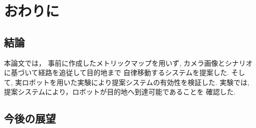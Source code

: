 \chapter{おわりに}
\label{chap:end}
\section{結論}
本論文では，
事前に作成したメトリックマップを用いず, 
カメラ画像とシナリオに基づいて経路を追従して目的地まで
自律移動するシステムを提案した.
そして, 実ロボットを用いた実験により提案システムの有効性を検証した.
実験では, 提案システムにより，ロボットが目的地へ到達可能であることを
確認した.

\section{今後の展望}
